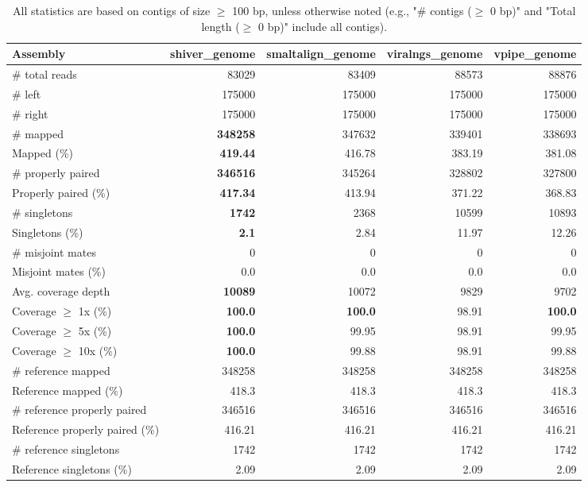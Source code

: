 \documentclass[12pt,a4paper]{article}
\begin{document}
\begin{table}[ht]
\begin{center}
\caption{All statistics are based on contigs of size $\geq$ 100 bp, unless otherwise noted (e.g., "\# contigs ($\geq$ 0 bp)" and "Total length ($\geq$ 0 bp)" include all contigs).}
\begin{tabular}{|l*{4}{|r}|}
\hline
Assembly & shiver\_genome & smaltalign\_genome & viralngs\_genome & vpipe\_genome \\ \hline
\# total reads & 83029 & 83409 & 88573 & 88876 \\ \hline
\# left & 175000 & 175000 & 175000 & 175000 \\ \hline
\# right & 175000 & 175000 & 175000 & 175000 \\ \hline
\# mapped & {\bf 348258} & 347632 & 339401 & 338693 \\ \hline
Mapped (\%) & {\bf 419.44} & 416.78 & 383.19 & 381.08 \\ \hline
\# properly paired & {\bf 346516} & 345264 & 328802 & 327800 \\ \hline
Properly paired (\%) & {\bf 417.34} & 413.94 & 371.22 & 368.83 \\ \hline
\# singletons & {\bf 1742} & 2368 & 10599 & 10893 \\ \hline
Singletons (\%) & {\bf 2.1} & 2.84 & 11.97 & 12.26 \\ \hline
\# misjoint mates & 0 & 0 & 0 & 0 \\ \hline
Misjoint mates (\%) & 0.0 & 0.0 & 0.0 & 0.0 \\ \hline
Avg. coverage depth & {\bf 10089} & 10072 & 9829 & 9702 \\ \hline
Coverage $\geq$ 1x (\%) & {\bf 100.0} & {\bf 100.0} & 98.91 & {\bf 100.0} \\ \hline
Coverage $\geq$ 5x (\%) & {\bf 100.0} & 99.95 & 98.91 & 99.95 \\ \hline
Coverage $\geq$ 10x (\%) & {\bf 100.0} & 99.88 & 98.91 & 99.88 \\ \hline
\# reference mapped & 348258 & 348258 & 348258 & 348258 \\ \hline
Reference mapped (\%) & 418.3 & 418.3 & 418.3 & 418.3 \\ \hline
\# reference properly paired & 346516 & 346516 & 346516 & 346516 \\ \hline
Reference properly paired (\%) & 416.21 & 416.21 & 416.21 & 416.21 \\ \hline
\# reference singletons & 1742 & 1742 & 1742 & 1742 \\ \hline
Reference singletons (\%) & 2.09 & 2.09 & 2.09 & 2.09 \\ \hline

\end{tabular}
\end{center}
\end{table}
\end{document}
